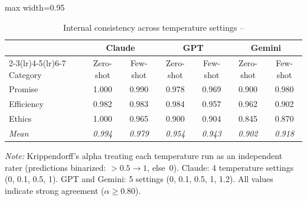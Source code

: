 \begin{table}
    \centering
    \caption{Internal consistency across temperature settings -- \citet{ederer_schneider_2022}}
    \label{tab:temp_irr_trust}
    \begin{adjustbox}{max width=0.95\linewidth}
    \small
    \begin{tabular}{lcccccc}
        \toprule
        & \multicolumn{2}{c}{Claude} & \multicolumn{2}{c}{GPT} & \multicolumn{2}{c}{Gemini} \\
        \cmidrule(lr){2-3}\cmidrule(lr){4-5}\cmidrule(lr){6-7}
        Category   & Zero-shot & Few-shot & Zero-shot & Few-shot & Zero-shot & Few-shot \\
        \midrule
        Promise    & 1.000 & 0.990 & 0.978 & 0.969 & 0.900 & 0.980 \\
        Efficiency & 0.982 & 0.983 & 0.984 & 0.957 & 0.962 & 0.902 \\
        Ethics     & 1.000 & 0.965 & 0.900 & 0.904 & 0.845 & 0.870 \\
        \midrule
        \textit{Mean} & \textit{0.994} & \textit{0.979} & \textit{0.954} & \textit{0.943} & \textit{0.902} & \textit{0.918} \\
        \bottomrule
    \end{tabular}
    \end{adjustbox}
    \vspace{0.2cm}
    \begin{minipage}{0.95\linewidth}
        \footnotesize
        \textit{Note:} Krippendorff's alpha treating each temperature run as an independent rater (predictions binarized: ${>}0.5\to 1$, else~0). Claude: 4 temperature settings (0, 0.1, 0.5, 1). GPT and Gemini: 5 settings (0, 0.1, 0.5, 1, 1.2). All values indicate strong agreement ($\alpha\geq0.80$).
    \end{minipage}
\end{table}
